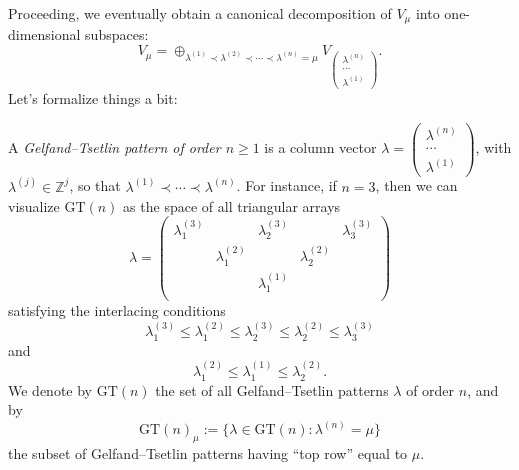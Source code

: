 \documentclass[reqno]{amsart} 
\begin{document}
Proceeding, we eventually obtain a canonical decomposition of $V_\mu$ into one-dimensional subspaces:
\begin{equation}\label{eq:}
  V_\mu
  =
  \oplus_{\lambda^{(1)} \prec
    \lambda^{(2)} \prec \dotsb \prec \lambda^{(n)} = \mu }
  V _{
\begin{pmatrix}
      \lambda^{(n)}  \\
      \dotsb \\
      \lambda^{(1)}
    \end{pmatrix}
  }.
\end{equation}
Let's formalize things a bit:
\begin{definition}
  A \emph{Gelfand--Tsetlin pattern of order $n \geq 1$} is a column vector $\lambda = 
\begin{pmatrix}
    \lambda^{(n)}  \\
    \dotsb   \\
    \lambda^{(1)}
  \end{pmatrix}
  $, with $\lambda^{(j)} \in \mathbb{Z}^j$, so that $\lambda^{(1)} \prec \dotsb \prec \lambda^{(n)}$.  For instance, if $n = 3$, then we can visualize $\mathrm{GT}(n)$ as the space of all triangular arrays
  \begin{equation}\label{eq:}
    \lambda =
    \begin{pmatrix}
      \lambda^{(3)}_1 &  & \lambda^{(3)}_2 & & \lambda^{(3)}_3 \\
      & \lambda^{(2)}_1 &  & \lambda^{(2)}_2 &  \\
      &  & \lambda^{(1)}_1 &  &  \\
    \end{pmatrix}
  \end{equation}
  satisfying the interlacing conditions
  \begin{equation}
    \lambda^{(3)}_1 \leq \lambda^{(2)}_1 \leq \lambda^{(3)}_2
    \leq \lambda^{(2)}_2
    \leq \lambda^{(3)}_3
  \end{equation}
  and
  \begin{equation}
    \lambda^{(2)}_1 \leq \lambda^{(1)}_1 \leq \lambda^{(2)}_2.
  \end{equation}
  We denote by $\mathrm{GT}(n)$ the set of all Gelfand--Tsetlin patterns $\lambda$ of order $n$, and by
  \begin{equation}\label{eq:}
    \mathrm{GT}(n)_{\mu} := \{\lambda \in \mathrm{GT}(n) : \lambda^{(n)}
    = \mu \}
  \end{equation}
  the subset of Gelfand--Tsetlin patterns having ``top row'' equal to $\mu$.
\end{definition}
\end{document}
